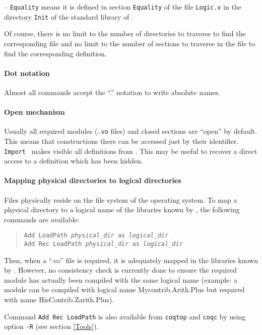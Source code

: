 \documentclass[11pt]{article}
\begin{document}
-- {\tt Equality} means it is defined in section {\tt Equality}
of the file {\tt Logic.v} in the directory {\tt Init} of the
standard library of \Coq.

\smallskip

Of course, there is no limit to the number of directories to traverse to
find the corresponding file and no limit to the number of sections to
traverse in the file to find the corresponding definition.

\paragraph{Dot notation} Almost all commands accept the ``.'' notation to
write absolute names.

\paragraph{Open mechanism} Usually all required modules ({\tt .vo}
files) and closed sections are ``open'' by default. This means that
constructions there can be accessed just by their identifier.
{\tt Import {\module}} makes visible all definitions from {\module}.
This may be useful to recover a direct access to a definition
which has been hidden.

\paragraph{Mapping physical directories to logical directories}

Files physically reside on the file system of the operating system. To
  map a physical directory to a logical name of the libraries known by
  \Coq, the following commands are available:

\begin{quote}
{\tt Add LoadPath {\it physical\_dir} as {\it logical\_dir}}\\
{\tt Add Rec LoadPath {\it physical\_dir} as {\it logical\_dir}}
\end{quote}

Then, when a ``.vo'' file is required, it is adequately mapped in the
libraries known by \Coq. However, no consistency check is currently
done to ensure the required module has actually been compiled with the
same logical name (example: a module can be compiled with
logical name Mycontrib.Arith.Plus but required with name
HisContrib.Zarith.Plus).

Command {\tt Add Rec LoadPath} is also available from {\tt coqtop} and
{\tt coqc} by using option \verb=-R= (see section \ref{Tools}).
\end{document}
